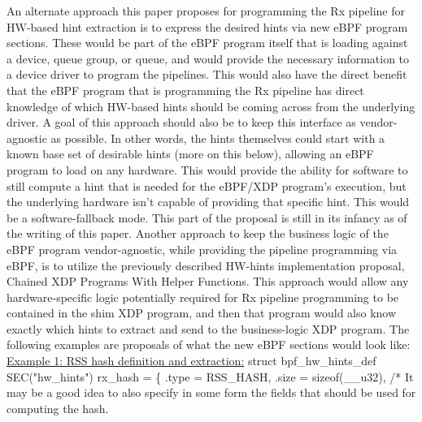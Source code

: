 \documentclass[letterpaper]{article}
\begin{document}
An alternate approach this paper proposes for programming the Rx pipeline for HW-based hint extraction is to express the desired hints via new eBPF program sections. These would be part of the eBPF program itself that is loading against a device, queue group, or queue, and would provide the necessary information to a device driver to program the pipelines. This would also have the direct benefit that the eBPF program that is programming the Rx pipeline has direct knowledge of which HW-based hints should be coming across from the underlying driver.
\newline
\indent A goal of this approach should also be to keep this interface as vendor-agnostic as possible. In other words, the hints themselves could start with a known base set of desirable hints (more on this below), allowing an eBPF program to load on any hardware. This would provide the ability for software to still compute a hint that is needed for the eBPF/XDP program's execution, but the underlying hardware isn't capable of providing that specific hint. This would be a software-fallback mode. This part of the proposal is still in its infancy as of the writing of this paper.
\newline
\indent Another approach to keep the business logic of the eBPF program vendor-agnostic, while providing the pipeline programming via eBPF, is to utilize the previously described HW-hints implementation proposal, Chained XDP Programs With Helper Functions. This approach would allow any hardware-specific logic potentially required for Rx pipeline programming to be contained in the shim XDP program, and then that program would also know exactly which hints to extract and send to the business-logic XDP program.
\newline
\newline
The following examples are proposals of what the new eBPF sections would look like:
\newline
\newline
\underline{Example 1: RSS hash definition and extraction:}
\newline
\newline
struct bpf\_hw\_hints\_def SEC("hw\_hints") rx\_hash = \{
\newline
\indent .type = RSS\_HASH,
\newline
\indent .size = sizeof(\_\_u32),
\newline
\indent /* It may be a good idea to also specify in some form
\newline
\indent  * the fields that should be used for computing the hash.
\end{document}
